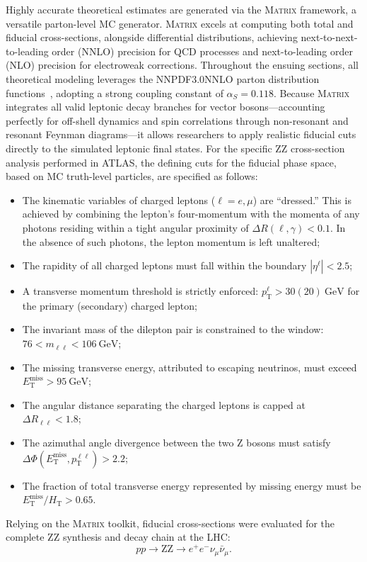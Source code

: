 Highly accurate theoretical estimates are generated via the \textsc{Matrix} framework, a versatile parton-level MC generator. \textsc{Matrix} excels at computing both total and fiducial cross-sections, alongside differential distributions, achieving next-to-next-to-leading order (NNLO) precision for QCD processes and next-to-leading order (NLO) precision for electroweak corrections. Throughout the ensuing sections, all theoretical modeling leverages the NNPDF3.0NNLO parton distribution functions~\cite{Ball2015NNPDF30}, adopting a strong coupling constant of $\alpha_S = 0.118$. 
Because \textsc{Matrix} integrates all valid leptonic decay branches for vector bosons—accounting perfectly for off-shell dynamics and spin correlations through non-resonant and resonant Feynman diagrams—it allows researchers to apply realistic fiducial cuts directly to the simulated leptonic final states.
For the specific $\text{ZZ}$ cross-section analysis performed in ATLAS, the defining cuts for the fiducial phase space, based on MC truth-level particles, are specified as follows:
\begin{itemize}
\item The kinematic variables of charged leptons ($\ell = e, \mu$) are ``dressed.'' This is achieved by combining the lepton's four-momentum with the momenta of any photons residing within a tight angular proximity of $\Delta R(\ell, \gamma) < 0.1$. In the absence of such photons, the lepton momentum is left unaltered;
\item The rapidity of all charged leptons must fall within the boundary $|{\eta}^{\ell} | < 2.5$;
\item A transverse momentum threshold is strictly enforced: $p_{\text{T}}^{\ell} > 30 (20)~\text{GeV}$ for the primary (secondary) charged lepton; 
\item The invariant mass of the dilepton pair is constrained to the window: $76 < m_{\ell\ell} < 106~\text{GeV}$;
\item The missing transverse energy, attributed to escaping neutrinos, must exceed $E_{\text{T}}^{\text{miss}} > 95~\text{GeV}$; %
\item The angular distance separating the charged leptons is capped at $\Delta R_{\ell\ell} < 1.8$;  %
\item The azimuthal angle divergence between the two Z bosons must satisfy $\Delta \Phi (E_{\text{T}}^{\text{miss}}, p_{\text{T}}^{\ell\ell}) > 2.2$;  %
\item The fraction of total transverse energy represented by missing energy must be $E_{\text{T}}^{\text{miss}}/H_{\text{T}} > 0.65$.
\end{itemize}
Relying on the \textsc{Matrix} toolkit, fiducial cross-sections were evaluated for the complete $\text{ZZ}$ synthesis and decay chain at the LHC:
$$pp \rightarrow \text{ZZ} \rightarrow e^+e^- \nu_\mu \bar{\nu}_\mu .$$

